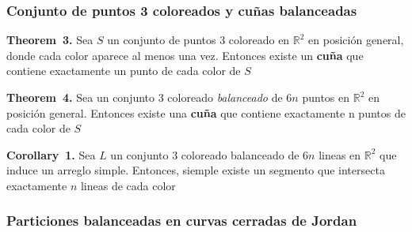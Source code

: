 \documentclass[xcolor=table]{beamer}
\begin{document}
\begin{mdframe}%

\frametitle{Conjunto de puntos 3 coloreados y cuñas balanceadas}\label{heading-sec-conjunto-de-puntos-3-coloreados-y-cuas-balanceadas}%
\end{mdframe}\label{sec-conjunto-de-puntos-3-coloreados-y-cuas-balanceadas}%

\begin{mdframe}%

\begin{mdbmarginx}{1ex}{0pt}{1ex}{0pt}%
\noindent{}\textbf{Theorem~3.} \mdbr
{}Sea $S$ un conjunto de puntos 3 coloreado en $\mathbb{R}^{2}$ en posición general, donde cada
color aparece al menos una vez. Entonces existe un \textbf{cuña} que contiene exactamente un punto
de cada color de $S$%
\end{mdbmarginx}%
\end{mdframe}%

\begin{mdframe}%

\begin{mdbmarginx}{1ex}{0pt}{1ex}{0pt}%
\noindent{}\textbf{Theorem~4.} \mdbr
{}Sea un conjunto 3 coloreado \emph{balanceado} de 6$n$ puntos en $\mathbb{R}^{2}$ en posición
general. Entonces existe una \textbf{cuña} que contiene exactamente n puntos de cada color de $S$%
\end{mdbmarginx}%

\begin{mdbmarginx}{1ex}{0pt}{1ex}{0pt}%
\noindent{}\textbf{Corollary~1.} \mdbr
{}Sea $L$ un conjunto 3 coloreado balanceado de 6$n$ lineas en $\mathbb{R}^2$ que induce un 
arreglo simple. Entonces, siemple existe un segmento que intersecta exactamente $n$ lineas
de cada color%
\end{mdbmarginx}%
\end{mdframe}%

\begin{mdframe}%

\frametitle{Particiones balanceadas en curvas cerradas de Jordan}\label{heading-sec-particiones-balanceadas-en-curvas-cerradas-de-jordan}%
\end{mdframe}\label{sec-particiones-balanceadas-en-curvas-cerradas-de-jordan}%
\end{document}
